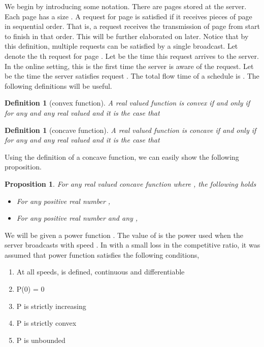 \documentclass[11pt]{article}
\newtheorem{definition}[lemma]{Definition}
\newtheorem{proposition}[lemma]{Proposition}
\begin{document}
We begin by introducing some notation.  There are  pages stored at the server.  Each page has a size .   A request for page  is satisfied if it receives  pieces of page  in sequential order.  That is, a request receives the transmission of page  from start to finish in that order. This will be further elaborated on later.   Notice that by this definition, multiple requests can be satisfied by a single broadcast. Let  denote the th request for page . Let  be the time this request arrives to the server.  In the online setting, this is the first time the server is aware of the request. Let  be the time the server satisfies request . The total flow time of a schedule is .  The following definitions will be useful.

\begin{definition}[convex function]
A real valued function  is convex if and only if for any  and any real valued  and  it is the case that  
\end{definition}

\begin{definition}[concave function]
A real valued function  is concave if and only if for any  and any real valued  and  it is the case that  
\end{definition}

Using the definition of a concave function, we can easily show the following proposition.

\begin{proposition}
\label{prop:one}
For any real valued concave function  where , the following holds
\begin{itemize}
\item For any positive real number , 

\item  For any positive real number  and any , 

\end{itemize}
\end{proposition}

We will be given a power function .  The value of  is the power used when the server broadcasts with speed .  In \cite{BansalCP09,GuptaKP10} with a small loss in the competitive ratio, it was assumed that power function  satisfies the following conditions,

\begin{enumerate}
\item At all speeds,  is defined, continuous and differentiable

\item  P(0) = 0

\item P is strictly increasing

\item P is strictly convex

\item P is unbounded

\end{enumerate}
\end{document}
